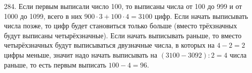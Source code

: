 284. Если первым выписали число 100, то выписаны числа от 100 до 999 и от 1000 до 1099, всего в них $900\cdot3+100\cdot4=3100$ цифр. Если начать выписывать числа позже, то цифр будет становиться только больше (вместо трёхзначных будут выписаны четырёхзначные). Если начать выписывать раньше, то вместо четырёхзначных будут выписываться двузначные числа, в которых на $4-2=2$ цифры меньше, значит надо начать выписывать на $(3100-3092):2=4$ числа раньше, то есть первым выписать $100-4=96.$\\
